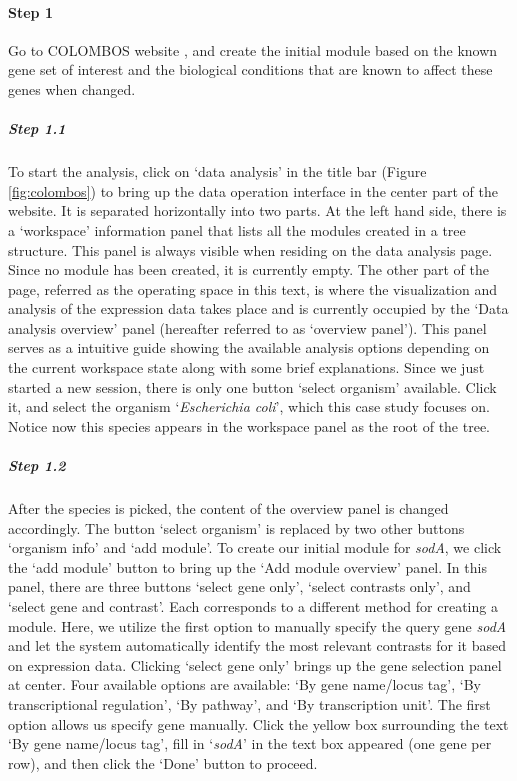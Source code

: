\begin{small} %

\paragraph{Step 1} 
Go to COLOMBOS website \cite{COLOMBOS}, and create the initial module based on the known gene set of interest and the biological conditions that are known to affect these genes when changed.

\subparagraph{Step 1.1}	To start the analysis, click on `data  analysis' in the title bar (Figure \ref{fig:colombos}) to bring up the data operation interface in the center part of the website.  It is separated horizontally into two parts. At the left hand side, there is a `workspace' information panel that lists all the modules created in a tree structure. This panel is always visible when residing on the data analysis page. Since no module has been created, it is currently empty. The other part of the page, referred as the operating space in this text, is where the visualization and analysis of the expression data takes place and is currently occupied by the `Data analysis overview' panel (hereafter referred to as `overview panel'). This panel serves as a intuitive guide showing the available analysis options depending on the current workspace state along with some brief explanations.\vspace{1.5mm} Since we just started a new session, there is only one button `select organism' available. Click it, and select the organism `\textit{Escherichia coli}', which this case study focuses on. Notice now this species appears in the workspace panel as the root of the tree.


\subparagraph{Step 1.2}	After the species is picked, the content of the  overview panel is changed accordingly. The button `select organism' is replaced by two other buttons `organism info' and `add module'. To create our initial module for \textit{sodA}, we click the `add module' button to bring up the `Add module overview' panel. In this panel, there are three buttons `select gene only', `select contrasts only', and `select gene and contrast'.  Each corresponds to a different method for creating a module. Here, we utilize the first option to manually specify the query gene \textit{sodA} and let the system automatically identify the most relevant contrasts for it based on expression data. Clicking `select gene only' brings up the gene selection panel at center.  Four available options are available: `By gene name/locus tag', `By transcriptional regulation', `By pathway', and `By transcription unit'. The first option allows us specify gene manually. Click the yellow box surrounding the text `By gene name/locus tag', fill in `\textit{sodA}' in the text box appeared (one gene per row), and then click the `Done' button to proceed.


\end{small}
